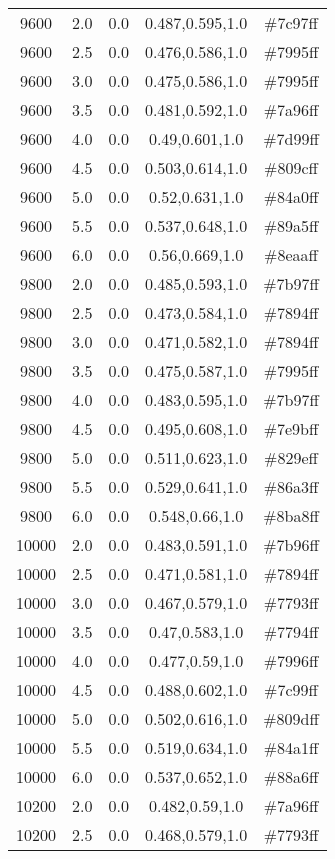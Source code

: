 \begin{tabular}{ccccc}
9600 & 2.0 & 0.0 & 0.487,0.595,1.0 & \#7c97ff \\ 
9600 & 2.5 & 0.0 & 0.476,0.586,1.0 & \#7995ff \\ 
9600 & 3.0 & 0.0 & 0.475,0.586,1.0 & \#7995ff \\ 
9600 & 3.5 & 0.0 & 0.481,0.592,1.0 & \#7a96ff \\ 
9600 & 4.0 & 0.0 & 0.49,0.601,1.0 & \#7d99ff \\ 
9600 & 4.5 & 0.0 & 0.503,0.614,1.0 & \#809cff \\ 
9600 & 5.0 & 0.0 & 0.52,0.631,1.0 & \#84a0ff \\ 
9600 & 5.5 & 0.0 & 0.537,0.648,1.0 & \#89a5ff \\ 
9600 & 6.0 & 0.0 & 0.56,0.669,1.0 & \#8eaaff \\ 
9800 & 2.0 & 0.0 & 0.485,0.593,1.0 & \#7b97ff \\ 
9800 & 2.5 & 0.0 & 0.473,0.584,1.0 & \#7894ff \\ 
9800 & 3.0 & 0.0 & 0.471,0.582,1.0 & \#7894ff \\ 
9800 & 3.5 & 0.0 & 0.475,0.587,1.0 & \#7995ff \\ 
9800 & 4.0 & 0.0 & 0.483,0.595,1.0 & \#7b97ff \\ 
9800 & 4.5 & 0.0 & 0.495,0.608,1.0 & \#7e9bff \\ 
9800 & 5.0 & 0.0 & 0.511,0.623,1.0 & \#829eff \\ 
9800 & 5.5 & 0.0 & 0.529,0.641,1.0 & \#86a3ff \\ 
9800 & 6.0 & 0.0 & 0.548,0.66,1.0 & \#8ba8ff \\ 
10000 & 2.0 & 0.0 & 0.483,0.591,1.0 & \#7b96ff \\ 
10000 & 2.5 & 0.0 & 0.471,0.581,1.0 & \#7894ff \\ 
10000 & 3.0 & 0.0 & 0.467,0.579,1.0 & \#7793ff \\ 
10000 & 3.5 & 0.0 & 0.47,0.583,1.0 & \#7794ff \\ 
10000 & 4.0 & 0.0 & 0.477,0.59,1.0 & \#7996ff \\ 
10000 & 4.5 & 0.0 & 0.488,0.602,1.0 & \#7c99ff \\ 
10000 & 5.0 & 0.0 & 0.502,0.616,1.0 & \#809dff \\ 
10000 & 5.5 & 0.0 & 0.519,0.634,1.0 & \#84a1ff \\ 
10000 & 6.0 & 0.0 & 0.537,0.652,1.0 & \#88a6ff \\ 
10200 & 2.0 & 0.0 & 0.482,0.59,1.0 & \#7a96ff \\ 
10200 & 2.5 & 0.0 & 0.468,0.579,1.0 & \#7793ff \\ 

\end{tabular}
